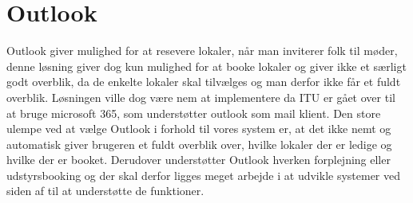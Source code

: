 \section{Outlook}
Outlook giver mulighed for at resevere lokaler, når man inviterer folk til møder, denne løsning giver dog kun mulighed for at booke lokaler og giver ikke et særligt godt overblik, da de enkelte lokaler skal tilvælges og man derfor ikke får et fuldt overblik. Løsningen ville dog være nem at implementere da ITU er gået over til at bruge microsoft 365, som understøtter outlook som mail klient. Den store ulempe ved at vælge Outlook i forhold til vores system er, at det ikke nemt og automatisk giver brugeren et fuldt overblik over, hvilke lokaler der er ledige og hvilke der er booket. Derudover understøtter Outlook hverken forplejning eller udstyrsbooking og der skal derfor ligges meget arbejde i at udvikle systemer ved siden af til at understøtte de funktioner.



